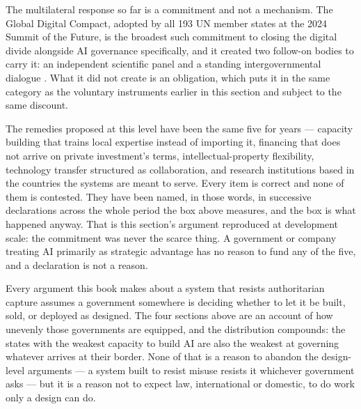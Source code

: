 The multilateral response so far is a commitment and not a mechanism. The Global Digital Compact, adopted by all 193 UN member states at the 2024 Summit of the Future, is the broadest such commitment to closing the digital divide alongside AI governance specifically, and it created two follow-on bodies to carry it: an independent scientific panel and a standing intergovernmental dialogue \autocite{un2024globaldigitalcompact}. What it did not create is an obligation, which puts it in the same category as the voluntary instruments earlier in this section and subject to the same discount.

The remedies proposed at this level have been the same five for years — capacity building that trains local expertise instead of importing it, financing that does not arrive on private investment's terms, intellectual-property flexibility, technology transfer structured as collaboration, and research institutions based in the countries the systems are meant to serve. Every item is correct and none of them is contested. They have been named, in those words, in successive declarations across the whole period the box above measures, and the box is what happened anyway. That is this section's argument reproduced at development scale: the commitment was never the scarce thing. A government or company treating AI primarily as strategic advantage has no reason to fund any of the five, and a declaration is not a reason.

Every argument this book makes about a system that resists authoritarian capture assumes a government somewhere is deciding whether to let it be built, sold, or deployed as designed. The four sections above are an account of how unevenly those governments are equipped, and the distribution compounds: the states with the weakest capacity to build AI are also the weakest at governing whatever arrives at their border. None of that is a reason to abandon the design-level arguments — a system built to resist misuse resists it whichever government asks — but it is a reason not to expect law, international or domestic, to do work only a design can do.
